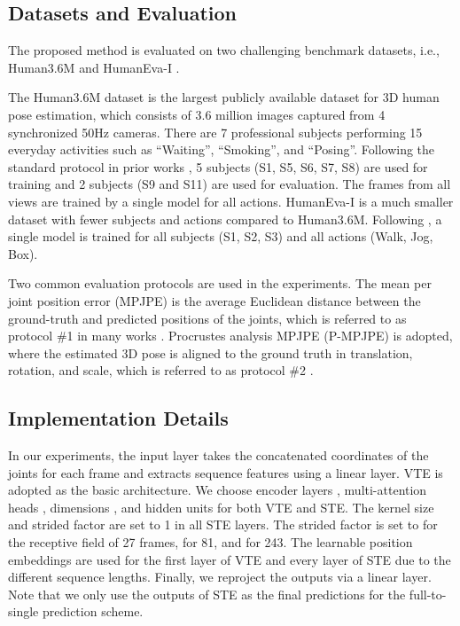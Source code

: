 \documentclass[10pt,twocolumn,letterpaper]{article}
\begin{document}
\subsection{Datasets and Evaluation}
The proposed method is evaluated on two challenging benchmark datasets, i.e., Human3.6M \cite{ionescu2013human3} and HumanEva-I \cite{sigal2010humaneva}. 

The Human3.6M dataset is the largest publicly available dataset for 3D human pose estimation, which consists of 3.6 million images captured from 4 synchronized 50Hz cameras. 
There are 7 professional subjects performing 15 everyday activities such as “Waiting”, “Smoking”, and “Posing”.
Following the standard protocol in prior works \cite{chen2019weakly,tome2018rethinking}, 5 subjects (S1, S5, S6, S7, S8) are used for training and 2 subjects (S9 and S11) are used for evaluation. 
The frames from all views are trained by a single model for all actions.
HumanEva-I is a much smaller dataset with fewer subjects and actions compared to Human3.6M. 
Following \cite{pavllo20193d,lee2018propagating}, a single model is trained for all subjects (S1, S2, S3) and all actions (Walk, Jog, Box). 

Two common evaluation protocols are used in the experiments. 
The mean per joint position error (MPJPE) is the average Euclidean distance between the ground-truth and predicted positions of the joints, which is referred to as protocol \#1 in many works \cite{fang2018learning,kocabas2019self}. 
Procrustes analysis MPJPE (P-MPJPE) is adopted, where the estimated 3D pose is aligned to the ground truth in translation, rotation, and scale, which is referred to as protocol \#2 \cite{martinez2017simple,rayat2018exploiting}. 

\subsection{Implementation Details}
In our experiments, the input layer takes the concatenated  coordinates of the  joints for each frame and extracts sequence features using a linear layer. 
VTE \cite{Attention} is adopted as the basic architecture. 
We choose encoder layers , multi-attention heads , dimensions , and hidden units  for both VTE and STE. 
The kernel size and strided factor  are set to 1 in all STE layers.
The strided factor  is set to  for the receptive field of 27 frames,  for 81, and  for 243. 
The learnable position embeddings are used for the first layer of VTE and every layer of STE due to the different sequence lengths. 
Finally, we reproject the outputs via a linear layer. 
Note that we only use the outputs of STE as the final predictions for the full-to-single prediction scheme. 
\end{document}
